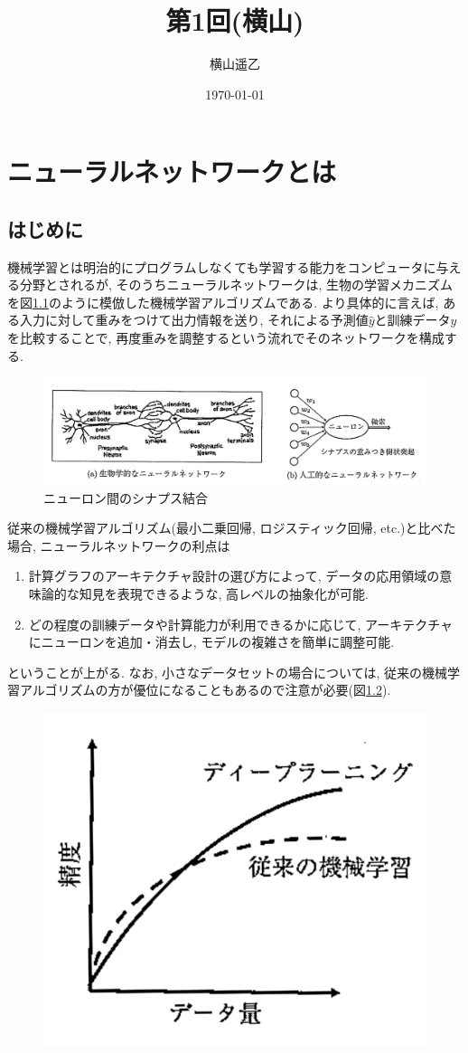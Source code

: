 \documentclass[dvipdfmx,report,11pt]{jsbook}
\title{第1回(横山)}
\author{横山遥乙}
\date{\today}
\begin{document}
\newcommand{\ctext}[1]{\raise0.2ex\hbox{\textcircled{\scriptsize{#1}}}}
\newcommand{\sign}{\operatorname{sign}}



\chapter{ニューラルネットワークとは}
\section{はじめに}
機械学習とは明治的にプログラムしなくても学習する能力をコンピュータに与える分野とされるが, そのうちニューラルネットワークは, 生物の学習メカニズムを図\ref{fig1}のように模倣した機械学習アルゴリズムである. より具体的に言えば, ある入力に対して重みをつけて出力情報を送り, それによる予測値$\hat{y}$と訓練データ$y$を比較することで, 再度重みを調整するという流れでそのネットワークを構成する.
\begin{figure}[H]
  \centering
    \includegraphics[width=0.8\linewidth]{figure/fig1.png}
    \caption{ニューロン間のシナプス結合}
    \label{fig1}
\end{figure}

従来の機械学習アルゴリズム(最小二乗回帰, ロジスティック回帰, etc.)と比べた場合, ニューラルネットワークの利点は
\begin{enumerate}
  \item 計算グラフのアーキテクチャ設計の選び方によって, データの応用領域の意味論的な知見を表現できるような, 高レベルの抽象化が可能.
  \item どの程度の訓練データや計算能力が利用できるかに応じて, アーキテクチャにニューロンを追加・消去し, モデルの複雑さを簡単に調整可能.
\end{enumerate}
ということが上がる. なお, 小さなデータセットの場合については, 従来の機械学習アルゴリズムの方が優位になることもあるので注意が必要(図\ref{fig2}).
\begin{figure}[H]
  \centering
    \includegraphics[width=0.3\linewidth]{figure/fig2.png}
    \caption{}
    \label{fig2}
\end{figure}
\end{document}
